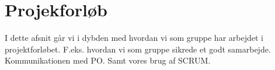 \section{Projekforløb}
I dette afsnit går vi i dybden med hvordan vi som gruppe har arbejdet i projektforløbet. F.eks. hvordan vi som gruppe sikrede et godt samarbejde. Kommunikationen med PO. Samt vores brug af SCRUM.



